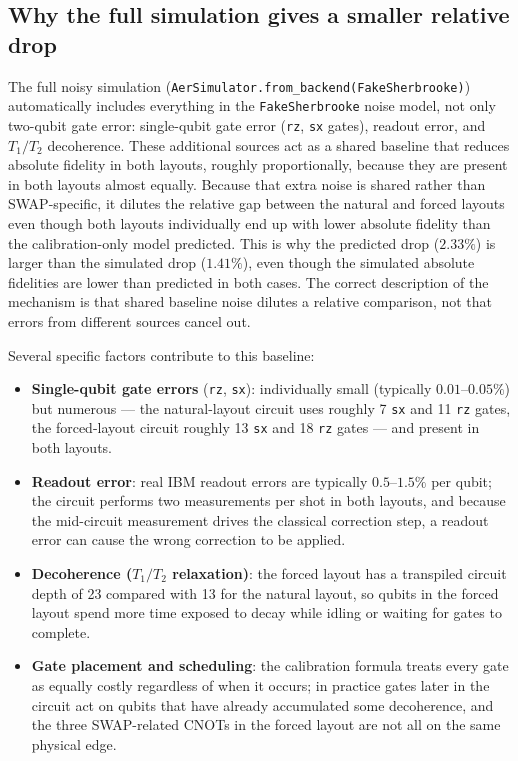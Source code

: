\documentclass[11pt]{article}
\begin{document}
\subsection{Why the full simulation gives a smaller relative drop}

The full noisy simulation (\texttt{AerSimulator.from\_backend(FakeSherbrooke)}) automatically includes everything in the \texttt{FakeSherbrooke} noise model, not only two-qubit gate error: single-qubit gate error (\texttt{rz}, \texttt{sx} gates), readout error, and $T_1/T_2$ decoherence. These additional sources act as a shared baseline that reduces absolute fidelity in both layouts, roughly proportionally, because they are present in both layouts almost equally. Because that extra noise is shared rather than SWAP-specific, it dilutes the relative gap between the natural and forced layouts even though both layouts individually end up with lower absolute fidelity than the calibration-only model predicted. This is why the predicted drop ($2.33\%$) is larger than the simulated drop ($1.41\%$), even though the simulated absolute fidelities are lower than predicted in both cases. The correct description of the mechanism is that shared baseline noise dilutes a relative comparison, not that errors from different sources cancel out.

Several specific factors contribute to this baseline:
\begin{itemize}[leftmargin=1.5em]
\item \textbf{Single-qubit gate errors} (\texttt{rz}, \texttt{sx}): individually small (typically $0.01$--$0.05\%$) but numerous --- the natural-layout circuit uses roughly 7 \texttt{sx} and 11 \texttt{rz} gates, the forced-layout circuit roughly 13 \texttt{sx} and 18 \texttt{rz} gates --- and present in both layouts.
\item \textbf{Readout error}: real IBM readout errors are typically $0.5$--$1.5\%$ per qubit; the circuit performs two measurements per shot in both layouts, and because the mid-circuit measurement drives the classical correction step, a readout error can cause the wrong correction to be applied.
\item \textbf{Decoherence ($T_1/T_2$ relaxation)}: the forced layout has a transpiled circuit depth of 23 compared with 13 for the natural layout, so qubits in the forced layout spend more time exposed to decay while idling or waiting for gates to complete.
\item \textbf{Gate placement and scheduling}: the calibration formula treats every gate as equally costly regardless of when it occurs; in practice gates later in the circuit act on qubits that have already accumulated some decoherence, and the three SWAP-related CNOTs in the forced layout are not all on the same physical edge.
\end{itemize}
\end{document}
